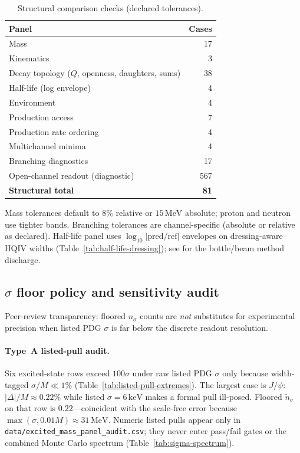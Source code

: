 \documentclass[11pt]{amsart}
\begin{document}
\begin{table}[ht]
\centering
\caption{Structural comparison checks (declared tolerances).}
\label{tab:benchmark-summary}
\begin{tabular}{@{}lr@{}}
\toprule
Panel & Cases \\
\midrule
Mass & 17 \\
Kinematics & 3 \\
Decay topology ($Q$, openness, daughters, sums) & 38 \\
Half-life (log envelope) & 4 \\
Environment & 4 \\
Production access & 7 \\
Production rate ordering & 4 \\
Multichannel minima & 4 \\
Branching diagnostics & 17 \\
Open-channel readout (diagnostic) & 567 \\
\midrule
\textbf{Structural total} & \textbf{81} \\
\bottomrule
\end{tabular}
\end{table}

Mass tolerances default to $8\%$ relative or $15\,\mathrm{MeV}$ absolute; proton
and neutron use tighter bands.
Branching tolerances are channel-specific (absolute or relative as declared).
Half-life panel uses $\log_{10}|\mathrm{pred}/\mathrm{ref}|$ envelopes on
dressing-aware HQIV widths (Table~\ref{tab:half-life-dressing}); see
\cite{hqiv-nucleon-binding-paper} for the bottle/beam method discharge.

\subsection{$\sigma$ floor policy and sensitivity audit}
\label{sec:sigma-floor-audit}

Peer-review transparency: floored $n_\sigma$ counts are \emph{not} substitutes for
experimental precision when listed PDG $\sigma$ is far below the discrete readout
resolution.






\paragraph{Type~A listed-pull audit.}
Six excited-state rows exceed $100\sigma$ under raw listed PDG $\sigma$ only because
width-tagged $\sigma/M\ll 1\%$
(Table~\ref{tab:listed-pull-extremes}).
The largest case is $J/\psi$: $|\Delta|/M\approx 0.22\%$ while listed
$\sigma=6\,\mathrm{keV}$ makes a formal pull ill-posed.
Floored $\tilde n_\sigma$ on that row is $0.22$---coincident with the scale-free
error because $\max(\sigma,0.01M)\approx 31\,\mathrm{MeV}$.
Numeric listed pulls appear only in \texttt{data/excited\_mass\_panel\_audit.csv};
they never enter pass/fail gates or the combined Monte Carlo spectrum
(Table~\ref{tab:sigma-spectrum}).
\end{document}

